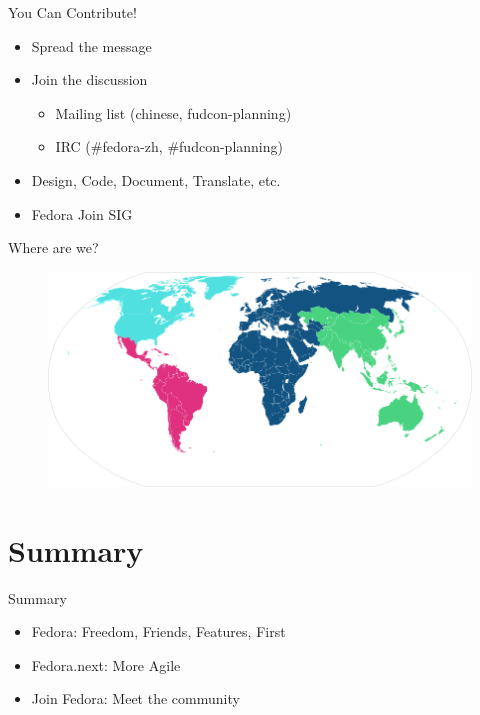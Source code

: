 \documentclass{beamer}
\begin{document}
\begin{frame}{You Can Contribute!}
  \begin{itemize}
    \item Spread the message
    \item Join the discussion
      \begin{itemize}
        \item Mailing list (chinese, fudcon-planning)
        \item IRC (\#fedora-zh, \#fudcon-planning)
      \end{itemize}
    \item Design, Code, Document, Translate, etc.
    \item Fedora Join SIG
  \end{itemize}
\end{frame}

\begin{frame}{Where are we?}
  \begin{figure}[htbp]
    \centering
    \includegraphics[width=\textwidth]{Ambassador-World-Map.png}
  \end{figure}
\end{frame}

\section*{Summary}

\begin{frame}{Summary}
  \begin{itemize}
  \item Fedora: Freedom, Friends, Features, First
  \item Fedora.next: More Agile
  \item Join Fedora: Meet the community
  \end{itemize}
\end{frame}
\end{document}

